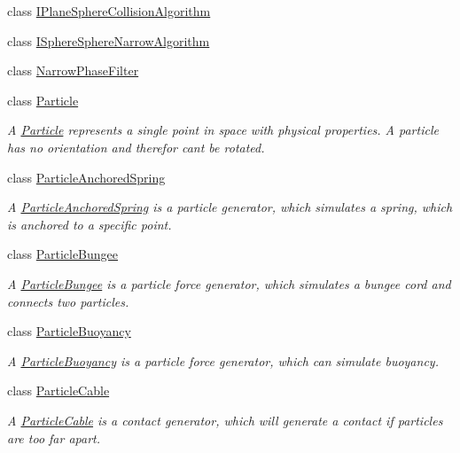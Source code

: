 \begin{DoxyCompactItemize}
\item 
class \mbox{\hyperlink{classr3_1_1_i_plane_sphere_collision_algorithm}{I\+Plane\+Sphere\+Collision\+Algorithm}}
\item 
class \mbox{\hyperlink{classr3_1_1_i_sphere_sphere_narrow_algorithm}{I\+Sphere\+Sphere\+Narrow\+Algorithm}}
\item 
class \mbox{\hyperlink{classr3_1_1_narrow_phase_filter}{Narrow\+Phase\+Filter}}
\item 
class \mbox{\hyperlink{classr3_1_1_particle}{Particle}}
\begin{DoxyCompactList}\small\item\em A \mbox{\hyperlink{classr3_1_1_particle}{Particle}} represents a single point in space with physical properties. A particle has no orientation and therefor can\textquotesingle{}t be rotated. \end{DoxyCompactList}\item 
class \mbox{\hyperlink{classr3_1_1_particle_anchored_spring}{Particle\+Anchored\+Spring}}
\begin{DoxyCompactList}\small\item\em A \mbox{\hyperlink{classr3_1_1_particle_anchored_spring}{Particle\+Anchored\+Spring}} is a particle generator, which simulates a spring, which is anchored to a specific point. \end{DoxyCompactList}\item 
class \mbox{\hyperlink{classr3_1_1_particle_bungee}{Particle\+Bungee}}
\begin{DoxyCompactList}\small\item\em A \mbox{\hyperlink{classr3_1_1_particle_bungee}{Particle\+Bungee}} is a particle force generator, which simulates a bungee cord and connects two particles. \end{DoxyCompactList}\item 
class \mbox{\hyperlink{classr3_1_1_particle_buoyancy}{Particle\+Buoyancy}}
\begin{DoxyCompactList}\small\item\em A \mbox{\hyperlink{classr3_1_1_particle_buoyancy}{Particle\+Buoyancy}} is a particle force generator, which can simulate buoyancy. \end{DoxyCompactList}\item 
class \mbox{\hyperlink{classr3_1_1_particle_cable}{Particle\+Cable}}
\begin{DoxyCompactList}\small\item\em A \mbox{\hyperlink{classr3_1_1_particle_cable}{Particle\+Cable}} is a contact generator, which will generate a contact if particles are too far apart. \end{DoxyCompactList}\item 

\end{DoxyCompactItemize}
